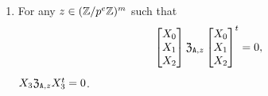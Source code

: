 \begin{lemma}
\begin{enumerate}
\item For any $z \in (\mathbb{Z} / p^e \mathbb{Z})^m$ such that 
\[\begin{bmatrix} X_0 \\ X_1 \\ X_2 \end{bmatrix} \mathfrak{Z}_{\mathtt{A}, z} \begin{bmatrix} X_0 \\ X_1  \\ X_2 \end{bmatrix}^t= 0,\]
$X_3 \mathfrak{Z}_{\mathtt{A}, z}  X_3^t = 0$. 

\end{enumerate} 
\end{lemma}
